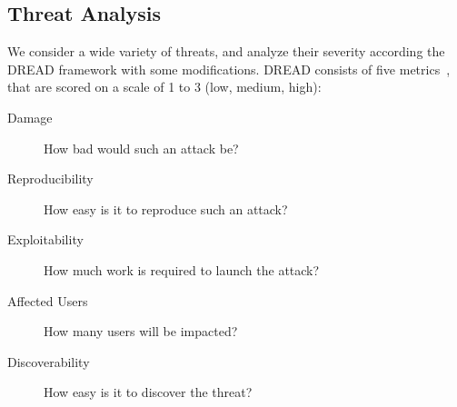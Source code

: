 \subsection{Threat Analysis}
We consider a wide variety of threats, and analyze their severity according the DREAD framework with some modifications. DREAD consists of five metrics~\cite{dread}, that are scored on a scale of 1 to 3 (low, medium, high):
\begin{description}
    \item [Damage] How bad would such an attack be?
    \item [Reproducibility] How easy is it to reproduce such an attack?
    \item [Exploitability] How much work is required to launch the attack?
    \item [Affected Users] How many users will be impacted?
    \item [Discoverability] How easy is it to discover the threat?
\end{description}

